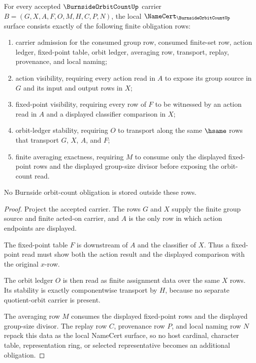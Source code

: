 \begin{theorem}
\label{thm:burnside-orbit-count-namecert-obligations}
For every accepted $\BurnsideOrbitCountUp$ carrier $B=(G,X,A,F,O,M,H,C,P,N)$, the local $\NameCert_{\BurnsideOrbitCountUp}$ surface consists exactly of the following finite obligation rows:
\begin{enumerate}
\item carrier admission for the consumed group row, consumed finite-set row, action ledger, fixed-point table, orbit ledger, averaging row, transport, replay, provenance, and local naming;
\item action visibility, requiring every action read in $A$ to expose its group source in $G$ and its input and output rows in $X$;
\item fixed-point visibility, requiring every row of $F$ to be witnessed by an action read in $A$ and a displayed classifier comparison in $X$;
\item orbit-ledger stability, requiring $O$ to transport along the same $\hsame$ rows that transport $G$, $X$, $A$, and $F$;
\item finite averaging exactness, requiring $M$ to consume only the displayed fixed-point rows and the displayed group-size divisor before exposing the orbit-count read.
\end{enumerate}
No Burnside orbit-count obligation is stored outside these rows.
\end{theorem}
\begin{proof}
Project the accepted carrier. The rows $G$ and $X$ supply the finite group source and finite acted-on carrier, and $A$ is the only row in which action endpoints are displayed.

The fixed-point table $F$ is downstream of $A$ and the classifier of $X$. Thus a fixed-point read must show both the action result and the displayed comparison with the original $x$-row.

The orbit ledger $O$ is then read as finite assignment data over the same $X$ rows. Its stability is exactly componentwise transport by $H$, because no separate quotient-orbit carrier is present.

The averaging row $M$ consumes the displayed fixed-point rows and the displayed group-size divisor. The replay row $C$, provenance row $P$, and local naming row $N$ repack this data as the local NameCert surface, so no host cardinal, character table, representation ring, or selected representative becomes an additional obligation.
\end{proof}

